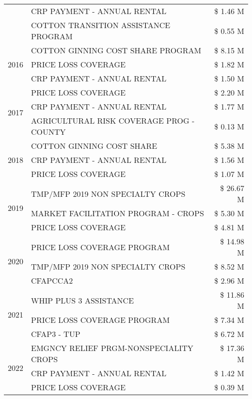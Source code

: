\begin{tabular}{llr}
 & CRP PAYMENT - ANNUAL RENTAL & \$ 1.46 M \\
 & COTTON TRANSITION ASSISTANCE PROGRAM & \$ 0.55 M \\
\cline{1-3}
\multirow[t]{3}{*}{2016} & COTTON GINNING COST SHARE PROGRAM & \$ 8.15 M \\
 & PRICE LOSS COVERAGE & \$ 1.82 M \\
 & CRP PAYMENT - ANNUAL RENTAL & \$ 1.50 M \\
\cline{1-3}
\multirow[t]{3}{*}{2017} & PRICE LOSS COVERAGE & \$ 2.20 M \\
 & CRP PAYMENT - ANNUAL RENTAL & \$ 1.77 M \\
 & AGRICULTURAL RISK COVERAGE PROG - COUNTY & \$ 0.13 M \\
\cline{1-3}
\multirow[t]{3}{*}{2018} & COTTON GINNING COST SHARE & \$ 5.38 M \\
 & CRP PAYMENT - ANNUAL RENTAL & \$ 1.56 M \\
 & PRICE LOSS COVERAGE & \$ 1.07 M \\
\cline{1-3}
\multirow[t]{3}{*}{2019} & TMP/MFP 2019 NON SPECIALTY CROPS & \$ 26.67 M \\
 & MARKET FACILITATION PROGRAM - CROPS & \$ 5.30 M \\
 & PRICE LOSS COVERAGE & \$ 4.81 M \\
\cline{1-3}
\multirow[t]{3}{*}{2020} & PRICE LOSS COVERAGE PROGRAM & \$ 14.98 M \\
 & TMP/MFP 2019 NON SPECIALTY CROPS & \$ 8.52 M \\
 & CFAPCCA2 & \$ 2.96 M \\
\cline{1-3}
\multirow[t]{3}{*}{2021} & WHIP PLUS 3 ASSISTANCE & \$ 11.86 M \\
 & PRICE LOSS COVERAGE PROGRAM & \$ 7.34 M \\
 & CFAP3 - TUP & \$ 6.72 M \\
\cline{1-3}
\multirow[t]{3}{*}{2022} & EMGNCY RELIEF PRGM-NONSPECIALITY CROPS & \$ 17.36 M \\
 & CRP PAYMENT - ANNUAL RENTAL & \$ 1.42 M \\
 & PRICE LOSS COVERAGE & \$ 0.39 M \\
\cline{1-3}
\bottomrule
\end{tabular}
